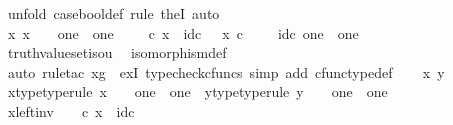 \begin{isabellebody}
%
\isadelimproof
%
\endisadelimproof
%
\isatagproof
{}\isamarkupfalse%
\ {\isacharparenleft}{\kern0pt}unfold\ case{\isacharunderscore}{\kern0pt}bool{\isacharunderscore}{\kern0pt}def{\isacharcomma}{\kern0pt}\ rule\ theI{\isacharprime}{\kern0pt}{\isacharcomma}{\kern0pt}\ auto{\isacharparenright}{\kern0pt}\isanewline
\ \ \isamarkupfalse%
\ {\isachardoublequoteopen}{\isasymexists}x{\isachardot}{\kern0pt}\ x\ {\isacharcolon}{\kern0pt}\ {\isasymOmega}\ {\isasymrightarrow}\ one\ {\isasymCoprod}\ one\ {\isasymand}\ {\isasymt}\ {\isasymamalg}\ {\isasymf}\ {\isasymcirc}\isactrlsub c\ x\ {\isacharequal}{\kern0pt}\ id\isactrlsub c\ {\isasymOmega}\ {\isasymand}\ x\ {\isasymcirc}\isactrlsub c\ {\isasymt}\ {\isasymamalg}\ {\isasymf}\ {\isacharequal}{\kern0pt}\ id\isactrlsub c\ {\isacharparenleft}{\kern0pt}one\ {\isasymCoprod}\ one{\isacharparenright}{\kern0pt}{\isachardoublequoteclose}\isanewline
\ \ \ \ \isamarkupfalse%
\ truth{\isacharunderscore}{\kern0pt}value{\isacharunderscore}{\kern0pt}set{\isacharunderscore}{\kern0pt}iso{\isacharunderscore}{\kern0pt}{}u{}\ \isamarkupfalse%
\ isomorphism{\isacharunderscore}{\kern0pt}def\isanewline
\ \ \ \ \isamarkupfalse%
\ {\isacharparenleft}{\kern0pt}auto{\isacharcomma}{\kern0pt}\ rule{\isacharunderscore}{\kern0pt}tac\ x{\isacharequal}{\kern0pt}g\ \ exI{\isacharcomma}{\kern0pt}\ typecheck{\isacharunderscore}{\kern0pt}cfuncs{\isacharcomma}{\kern0pt}\ simp\ add{\isacharcolon}{\kern0pt}\ cfunc{\isacharunderscore}{\kern0pt}type{\isacharunderscore}{\kern0pt}def{\isacharparenright}{\kern0pt}\isanewline
{}\isamarkupfalse%
\isanewline
\ \ \isamarkupfalse%
\ x\ y\isanewline
\ \ \isamarkupfalse%
\ x{\isacharunderscore}{\kern0pt}type{\isacharbrackleft}{\kern0pt}type{\isacharunderscore}{\kern0pt}rule{\isacharbrackright}{\kern0pt}{\isacharcolon}{\kern0pt}\ {\isachardoublequoteopen}x\ {\isacharcolon}{\kern0pt}\ {\isasymOmega}\ {\isasymrightarrow}\ one\ {\isasymCoprod}\ one{\isachardoublequoteclose}\ \ y{\isacharunderscore}{\kern0pt}type{\isacharbrackleft}{\kern0pt}type{\isacharunderscore}{\kern0pt}rule{\isacharbrackright}{\kern0pt}{\isacharcolon}{\kern0pt}\ {\isachardoublequoteopen}y\ {\isacharcolon}{\kern0pt}\ {\isasymOmega}\ {\isasymrightarrow}\ one\ {\isasymCoprod}\ one{\isachardoublequoteclose}\isanewline
\ \ \isamarkupfalse%
\ x{\isacharunderscore}{\kern0pt}left{\isacharunderscore}{\kern0pt}inv{\isacharcolon}{\kern0pt}\ {\isachardoublequoteopen}{\isasymt}\ {\isasymamalg}\ {\isasymf}\ {\isasymcirc}\isactrlsub c\ x\ {\isacharequal}{\kern0pt}\ id\isactrlsub c\ {\isasymOmega}{\isachardoublequoteclose}\isanewline

\end{isabellebody}
